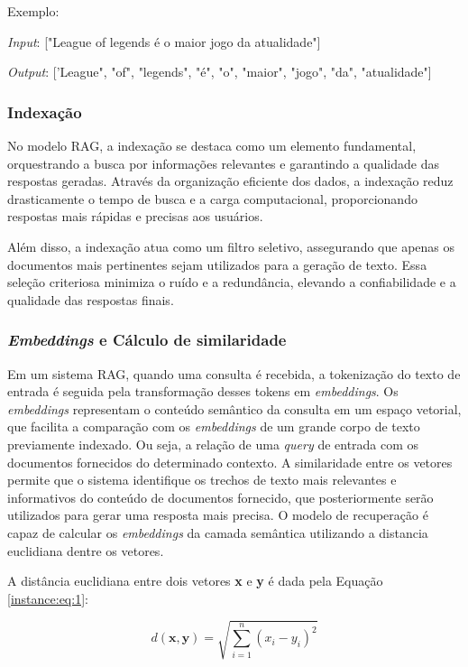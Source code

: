 Exemplo:

\textit{Input}: ["League of legends é o maior jogo da atualidade"]

\textit{Output}: ['League", "of", "legends", "é", "o", "maior", "jogo", "da", "atualidade"]


\subsubsection{Indexação}

No modelo RAG, a indexação se destaca como um elemento fundamental, orquestrando a busca por informações relevantes e garantindo a qualidade das respostas geradas. Através da organização eficiente dos dados, a indexação reduz drasticamente o tempo de busca e a carga computacional, proporcionando respostas mais rápidas e precisas aos usuários.

Além disso, a indexação atua como um filtro seletivo, assegurando que apenas os documentos mais pertinentes sejam utilizados para a geração de texto. Essa seleção criteriosa minimiza o ruído e a redundância, elevando a confiabilidade e a qualidade das respostas finais.


\subsubsection{\textit{Embeddings} e Cálculo de similaridade}

Em um sistema RAG, quando uma consulta é recebida, a tokenização do texto de entrada é seguida pela transformação desses tokens em \textit{embeddings}. Os \textit{embeddings} representam o conteúdo semântico da consulta em um espaço vetorial, que facilita a comparação com os \textit{embeddings} de um grande corpo de texto previamente indexado. Ou seja, a relação de uma \textit{query} de entrada com os documentos fornecidos do determinado contexto. A similaridade entre os vetores permite que o sistema identifique os trechos de texto mais relevantes e informativos do conteúdo de documentos fornecido, que posteriormente serão utilizados para gerar uma resposta mais precisa. O modelo de recuperação é capaz de calcular os \textit{embeddings} da camada semântica utilizando a distancia euclidiana dentre os vetores.

A distância euclidiana \cite{DANIELSSON1980227} entre dois vetores \textbf{x} e \textbf{y} é dada pela  Equação \ref{instance:eq:1}:

\begin{equation}
    \label{instance:eq:1}
    d(\mathbf{x}, \mathbf{y}) = \sqrt{\sum_{i=1}^{n} (x_i - y_i)^2}
\end{equation}


